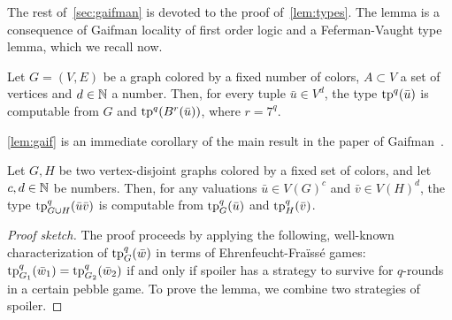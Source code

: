 
\medskip The rest of~\cref{sec:gaifman} is devoted to the proof of~\cref{lem:types}.
The lemma is a consequence of Gaifman locality of first order logic and a Feferman-Vaught type  lemma, which we recall now.
\medskip



\begin{lemma}\label{lem:gaif}
  Let $G=(V,E)$ be a graph colored by a fixed number of colors, $A\subset V$ a set of vertices and $d\in \mathbb{N}$ a number.
  Then, for every tuple $\bar u\in V^d$, the type  $\mathrm{tp}^q(\bar u)$ is computable from $G$ and $\mathrm{tp}^q(B^r(\bar u))$, where $r=7^q$.
\end{lemma}
\cref{lem:gaif} is an immediate corollary of the main result in the paper of Gaifman~\cite{gaifman1982local}.



\begin{lemma}\label{lem:fv}
  Let $G,H$ be two vertex-disjoint  graphs colored by a fixed set of colors, and let 
  $c,d\in\mathbb{N}$  be numbers.
    Then, for any valuations
 $\bar u\in V(G)^{c}$ and $\bar v\in V(H)^{d}$, 
 the type 
 $\mathrm{tp}^q_{G\cup H}(\bar u\bar v)$
 is computable from $\mathrm{tp}^q_G(\bar u)$
 and $\mathrm{tp}^q_H(\bar v)$.
\end{lemma}
\begin{proof}[Proof sketch]The proof proceeds by applying the following, well-known characterization of $\mathrm{tp}^q_G(\bar w)$ in terms of Ehrenfeucht-Fra\"iss\'e games:
$\mathrm{tp}^q_{G_1}(\bar w_1)=\mathrm{tp}^q_{G_2}(\bar w_2)$
if and only if spoiler has a strategy to survive for $q$-rounds in a certain pebble game.
To prove the lemma, we combine two strategies of spoiler.
\end{proof}


